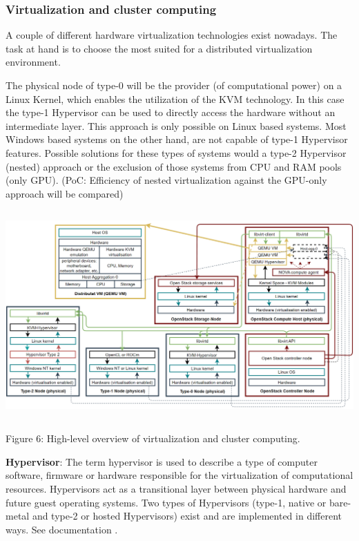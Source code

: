 \documentclass[]{article}
\begin{document}
\subsubsection{Virtualization and cluster computing}
A couple of different hardware virtualization technologies exist nowadays. 
The task at hand is to choose the most suited for a distributed virtualization environment. 

The physical node of type-0 will be the provider (of computational power) on a Linux Kernel, which enables the utilization of the KVM technology. 
In this case the type-1 Hypervisor can be used to directly access the hardware without an intermediate layer. 
This approach is only possible on Linux based systems.
Most Windows based systems on the other hand, are not capable of type-1 Hypervisor features.
Possible solutions for these types of systems would a type-2 Hypervisor (nested) approach or the exclusion of those systems from CPU and RAM pools (only GPU).
(PoC: Efficiency of nested virtualization against the GPU-only approach will be compared)

\begin{center}
	\includegraphics[height=8cm]{virtualisation-overview}
\end{center}
\begin{center}
	Figure 6: High-level overview of virtualization and cluster computing.
\end{center}

\textbf{Hypervisor}:
The term hypervisor is used to describe a type of computer software, firmware or hardware responsible for the virtualization of computational resources.
Hypervisors act as a transitional layer between physical hardware and future guest operating systems.
Two types of Hypervisors (type-1, native or bare-metal and type-2 or hosted Hypervisors) exist and are implemented in different ways. See documentation \cite{Wikipedia-Hypervisor}.  
\end{document}
